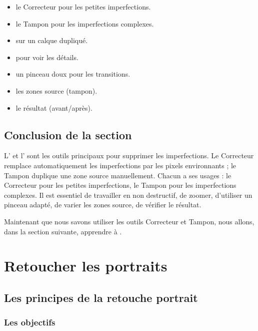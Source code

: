 \begin{itemize}
    \item {} le Correcteur pour les petites imperfections.
    \item {} le Tampon pour les imperfections complexes.
    \item {} sur un calque dupliqué.
    \item {} pour voir les détails.
    \item {} un pinceau doux pour les transitions.
    \item {} les zones source (tampon).
    \item {} le résultat (avant/après).
\end{itemize}

\subsection*{Conclusion de la section}

L' et l' sont les outils principaux pour supprimer les imperfections. Le Correcteur remplace automatiquement les imperfections par les pixels environnants ; le Tampon duplique une zone source manuellement. Chacun a ses usages : le Correcteur pour les petites imperfections, le Tampon pour les imperfections complexes. Il est essentiel de travailler en non destructif, de zoomer, d'utiliser un pinceau adapté, de varier les zones source, de vérifier le résultat.

Maintenant que nous savons utiliser les outils Correcteur et Tampon, nous allons, dans la section suivante, apprendre à .

\section{Retoucher les portraits}

\subsection{Les principes de la retouche portrait}

\subsubsection{Les objectifs}

